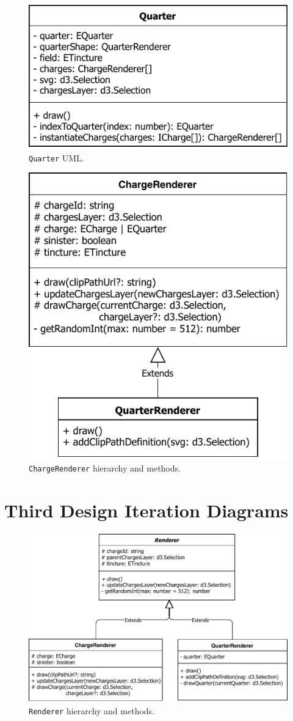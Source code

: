 \begin{figure}[h]
  \includegraphics[width=0.5\linewidth]{QuarterUML}
  \caption{\texttt{Quarter} UML.}%
  \label{fig:QuarterUML}
\end{figure}

\begin{figure}[h]
  \includegraphics[width=0.5\linewidth]{ChargeRendererUML}%
  \caption{\texttt{ChargeRenderer} hierarchy and methods.}%
  \label{fig:charge_renderer_hierarchy}
\end{figure}

\pagebreak%

\section{Third Design Iteration Diagrams}%
\label{sec:third_design_iteration_diagrams}

\begin{figure}[h]
  \includegraphics[width=0.8\linewidth]{RendererUML}
  \caption{\texttt{Renderer} hierarchy and methods.}%
  \label{fig:RendererUML}
\end{figure}

